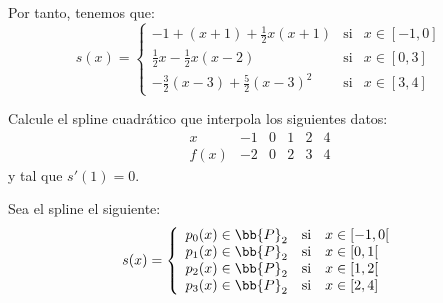 \begin{ejercicio}
    Por tanto, tenemos que:
    \begin{equation*}
        s(x)=\left\{\begin{array}{lll}
            -1+(x+1)+\frac{1}{2}x(x+1) & \text{si} & x\in [-1,0] \\
            \frac{1}{2}x-\frac{1}{2}x(x-2) & \text{si} & x\in [0,3] \\
            -\frac{3}{2}(x-3)+\frac{5}{2}(x-3)^2 & \text{si} & x\in [3,4]
        \end{array}\right.
    \end{equation*}
    
\end{ejercicio}

\begin{ejercicio}
    Calcule el spline cuadrático que interpola los siguientes datos:
    \begin{equation*}
        \begin{array}{c|ccccc}
            x & -1 & 0 & 1 & 2 & 4 \\ \hline
            f(x) & -2 & 0 & 2 & 3 & 4
        \end{array}
    \end{equation*}
    y tal que $s'(1) = 0$.

    Sea el spline el siguiente:
    \begin{equation*}
        s(x)=\left\{\begin{array}{ccl}
            p_0(x)\in \bb{P}_2 & \text{si} & x\in [-1, 0[ \\
            p_{1}(x)\in \bb{P}_2 & \text{si} & x\in [0,1[ \\
            p_{2}(x)\in \bb{P}_2 & \text{si} & x\in [1,2[ \\
            p_{3}(x)\in \bb{P}_2 & \text{si} & x\in [2,4]
        \end{array} \right.
    \end{equation*}


\end{ejercicio}
